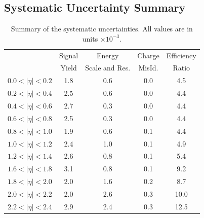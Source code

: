 \subsection{Systematic Uncertainty Summary}

\begin{table}[htbp]
 \begin{center}
   \begin{tabular}{lcccc}
      &Signal & Energy & Charge &  Efficiency \\
     & Yield & Scale and Res. & MisId. & Ratio \\ \hline
$0.0<|\eta|<0.2$ & 1.8 & 0.6 & 0.0 &  4.5 \\
$0.2<|\eta|<0.4$ & 2.5 & 0.6 & 0.0 &  4.4 \\
$0.4<|\eta|<0.6$ & 2.7 & 0.3 & 0.0 &  4.4 \\
$0.6<|\eta|<0.8$ & 2.5 & 0.3 & 0.0 &  4.4 \\
$0.8<|\eta|<1.0$ & 1.9 & 0.6 & 0.1 &  4.4 \\
$1.0<|\eta|<1.2$ & 2.4 & 1.0 & 0.1 &  4.9 \\
$1.2<|\eta|<1.4$ & 2.6 & 0.8 & 0.1 &  5.4 \\
$1.6<|\eta|<1.8$ & 3.1 & 0.8 & 0.1 &  9.2 \\
$1.8<|\eta|<2.0$ & 2.0 & 1.6 & 0.2 &  8.7 \\
$2.0<|\eta|<2.2$ & 2.0 & 2.6 & 0.3 & 10.0 \\
$2.2<|\eta|<2.4$ & 2.9 & 2.4 & 0.3 & 12.5 \\
    \end{tabular}
  \end{center}
 \caption{\label{tab:summarysyst}Summary of the systematic uncertainties. All values are in units $\times 10^{-3}$. }
\end{table}
                  

